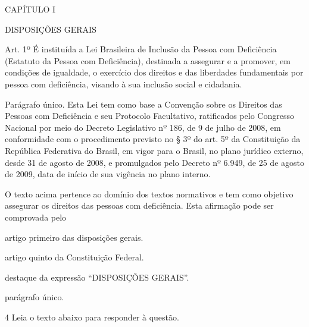 \begin{myquote}

CAPÍTULO I

DISPOSIÇÕES GERAIS

Art. 1º É instituída a Lei Brasileira de Inclusão da Pessoa com
Deficiência (Estatuto da Pessoa com Deficiência), destinada a assegurar
e a promover, em condições de igualdade, o exercício dos direitos e das
liberdades fundamentais por pessoa com deficiência, visando à sua
inclusão social e cidadania.

Parágrafo único. Esta Lei tem como base a Convenção sobre os Direitos
das Pessoas com Deficiência e seu Protocolo Facultativo, ratificados
pelo Congresso Nacional por meio do Decreto Legislativo nº 186, de 9 de
julho de 2008, em conformidade com o procedimento previsto no § 3º do
art. 5º da Constituição da República Federativa do Brasil, em vigor
para o Brasil, no plano jurídico externo, desde 31 de agosto de 2008, e
promulgados pelo Decreto nº 6.949, de 25 de agosto de 2009, data de
início de sua vigência no plano interno.


\end{myquote}

O texto acima pertence ao domínio dos textos normativos e tem como
objetivo assegurar os direitos das pessoas com deficiência. Esta
afirmação pode ser comprovada pelo

\begin{escolha}
    
    \item artigo primeiro das disposições gerais.
    
    \item artigo quinto da Constituição Federal.
    
    \item destaque da expressão ``DISPOSIÇÕES GERAIS''.
    
    \item parágrafo único.

\end{escolha}

\num{4} Leia o texto abaixo para responder à questão. 

